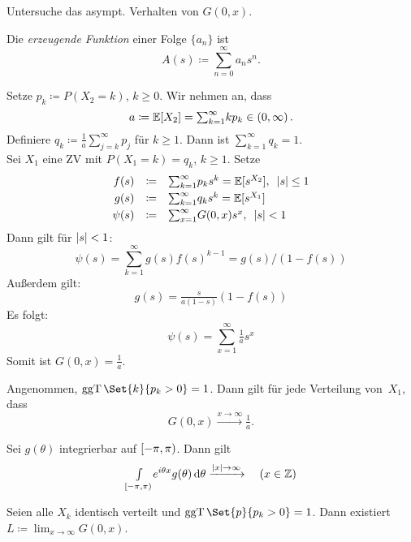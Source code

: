 \documentclass{cheat-sheet}
\newcommand{\E}{\mathbb{E}} %
\DeclareMathOperator{\ggT}{ggT} %
\begin{document}
\begin{ziel}
  Untersuche das asympt. Verhalten von $G(0, x)$.
\end{ziel}

\begin{defn}
  Die \emph{erzeugende Funktion} einer Folge $\{ a_n \}$ ist
  \[ A(s) \coloneqq {\sum}_{n=0}^\infty a_n s^n. \]
\end{defn}

\begin{bsp}
  Setze $p_k \coloneqq P(X_2 = k)$, $k \geq 0$.
  Wir nehmen an, dass
  \[ a \coloneqq \E[X_2] = {\sum}_{k=1}^\infty k p_k \in \ointerval{0}{\infty}. \]
  Definiere
  $q_k \coloneqq \tfrac{1}{a} {\sum}_{j=k}^\infty p_j$
  für $k \geq 1$.
  Dann ist ${\sum}_{k=1}^\infty q_k = 1$. \\
  Sei $X_1$ eine ZV mit $P(X_1=k) = q_k$, $k \geq 1$.
  Setze
  \[
    \begin{array}{r c l}
      f(s) &\coloneqq& {\sum}_{k=1}^\infty p_k s^k = \E[s^{X_2}], \enspace \abs{s} \leq 1 \\[0.1cm]
      g(s) &\coloneqq& {\sum}_{k=1}^\infty q_k s^k = \E[s^{X_1}] \\[0.1cm]
      \psi(s) &\coloneqq& {\sum}_{x=1}^\infty G(0, x) s^x, \enspace \abs{s} < 1
    \end{array}
  \]
  Dann gilt für $\lvert s\rvert < 1$:
  \[ \psi(s) = {\sum}_{k=1}^\infty g(s) f(s)^{k-1} = g(s)/(1 - f(s)) \]
  Außerdem gilt:
  \[ g(s) = \tfrac{s}{a (1-s)} (1 - f(s)) \]
  Es folgt:
  \[ \psi(s) = \sum_{x=1}^\infty \tfrac{1}{a} s^x \]
  Somit ist $G(0, x) = \tfrac{1}{a}$.
\end{bsp}

\begin{satz}
  Angenommen, $\ggT \Set{k}{p_k > 0} = 1$.
  Dann gilt für jede Verteilung von~$X_1$, dass
  \[ G(0, x) \xrightarrow{x \to \infty} \tfrac{1}{a}. \]
\end{satz}

\begin{lem}
  Sei $g(\theta)$ integrierbar auf $\left[ -\pi, \pi \right)$.
  Dann gilt
  \[
    {\textstyle \int\limits_{\left[ -\pi, \pi \right)}^{}} e^{i \theta x} g(\theta) \,\mathrm{d} \theta \xrightarrow{\lvert x\rvert \to \infty}
    \quad (x \in \mathbb{Z})
  \]
\end{lem}

\begin{lem}
  \begin{minipage}[t]{0.8 \linewidth}
    Seien alle $X_k$ identisch verteilt und $\ggT \Set{p}{p_k > 0} = 1$.
    Dann existiert $L \coloneqq {\lim}_{x \to \infty} G(0, x)$.
  \end{minipage}
\end{lem}
\end{document}

